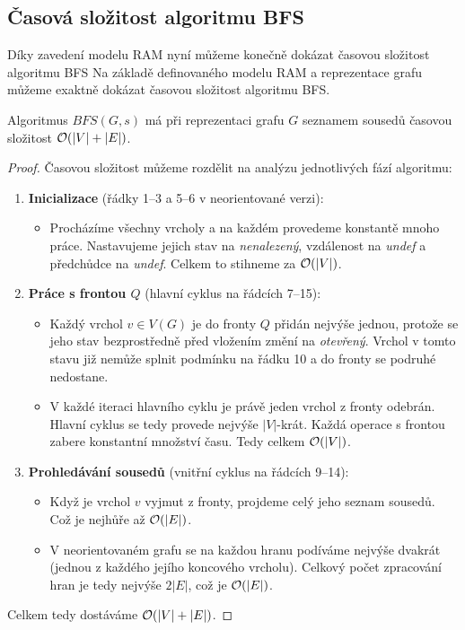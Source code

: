 \subsection{Časová složitost algoritmu BFS}

Díky zavedení modelu RAM nyní můžeme konečně dokázat časovou složitost algoritmu BFS
Na základě definovaného modelu RAM a reprezentace grafu můžeme exaktně dokázat časovou složitost algoritmu BFS. 

\medskip

\begin{theorem}
Algoritmus $BFS(G, s)$ má při reprezentaci grafu $G$ seznamem sousedů časovou složitost $\mathcal{O}(|V| + |E|)$.
\end{theorem} 

\begin{proof}
Časovou složitost můžeme rozdělit na analýzu jednotlivých fází algoritmu:
\begin{enumerate}
    \item \textbf{Inicializace} (řádky 1--3 a 5--6 v neorientované verzi):
    \begin{itemize}
        \item Procházíme všechny vrcholy a na každém provedeme konstantě mnoho práce. Nastavujeme jejich stav na \textit{nenalezený}, vzdálenost na \textit{undef} a předchůdce na \textit{undef}. Celkem to stihneme za $\mathcal{O}(|V|)$.
    \end{itemize}
    \item \textbf{Práce s frontou $Q$} (hlavní cyklus na řádcích 7--15):
    \begin{itemize}
        \item Každý vrchol $v \in V(G)$ je do fronty $Q$ přidán nejvýše jednou, protože se jeho stav bezprostředně před vložením změní na \textit{otevřený}. Vrchol v tomto stavu již nemůže splnit podmínku na řádku 10 a do fronty se podruhé nedostane.
        \item V každé iteraci hlavního cyklu je právě jeden vrchol z fronty odebrán. Hlavní cyklus se tedy provede nejvýše $|V|$-krát. Každá operace s frontou zabere konstantní množství času. Tedy celkem $\mathcal{O}(|V|)$.
    \end{itemize}
    \item \textbf{Prohledávání sousedů} (vnitřní cyklus na řádcích 9--14):
    \begin{itemize}
        \item Když je vrchol $v$ vyjmut z fronty, projdeme celý jeho seznam sousedů. Což je nejhůře až $\mathcal{O}(|E|)$.
        \item V neorientovaném grafu se na každou hranu podíváme nejvýše dvakrát (jednou z každého jejího koncového vrcholu). Celkový počet zpracování hran je tedy nejvýše $2|E|$, což je $\mathcal{O}(|E|)$.
    \end{itemize}
\end{enumerate}
Celkem tedy dostáváme $\mathcal{O}(|V| + |E|)$.
\end{proof} \bigskip

